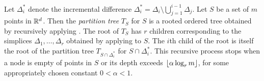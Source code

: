 \documentclass{patmorin}
\begin{document}
%
%
%

Let $\Delta_i^*$ denote the incremental difference
$\Delta_i^*=\Delta_i\setminus\bigcup_{j=1}^{i-1}\Delta_j$.  Let $S$
be a set of $m$ points in $\mathbb{R}^d$. Then the \emph{partition tree}
$T_S$ for $S$ is a rooted ordered tree obtained by recursively
applying .  The root of $T_S$ has $r$ children
corresponding to the simplices $\Delta_1,\ldots,\Delta_{r}$ obtained
by applying  to $S$.  The $i$th child of the
root is itself the root of the partition tree $T_{S\cap\Delta_i^*}$
for $S\cap\Delta_i^*$. This recursive process stops when a node is
empty of points in $S$ or its depth exceeds ${\left\lfloor \alpha\log_r m \right\rfloor}$,
for some appropriately chosen constant $0< \alpha < 1$.
\end{document}
